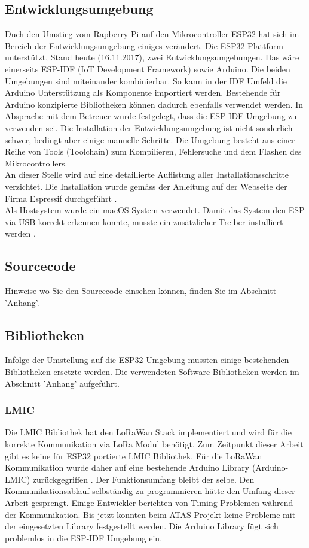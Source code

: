 \documentclass[11pt,english,german]{report}
\theoremstyle{definition}
\begin{document}
\subsection{Entwicklungsumgebung}
Duch den Umstieg vom Rapberry Pi auf den Mikrocontroller ESP32 hat sich im Bereich der Entwicklungsumgebung einiges verändert. Die ESP32 Plattform unterstützt, Stand heute (16.11.2017), zwei Entwicklungsumgebungen. Das wäre einerseits ESP-IDF (IoT Development Framework) sowie Arduino\cite{espidfarduino}. Die beiden Umgebungen sind miteinander kombinierbar. So kann in der IDF Umfeld die Arduino Unterstützung als Komponente importiert werden. Bestehende für Arduino konzipierte Bibliotheken können dadurch ebenfalls verwendet werden. In Absprache mit dem Betreuer wurde festgelegt, dass die ESP-IDF Umgebung zu verwenden sei. Die Installation der Entwicklungsumgebung ist nicht sonderlich schwer, bedingt aber einige manuelle Schritte. Die Umgebung besteht aus einer Reihe von Tools (Toolchain) zum Kompilieren, Fehlersuche und dem Flashen des Mikrocontrollers.\\[0.3cm]
An dieser Stelle wird auf eine detaillierte Auflistung aller Installationsschritte verzichtet. Die Installation wurde gemäss der Anleitung auf der Webseite der Firma Espressif durchgeführt \cite{espidfinstallation}.\\[0.3cm]
Als Hostsystem wurde ein macOS System verwendet. Damit das System den ESP via USB korrekt erkennen konnte, musste ein zusätzlicher Treiber installiert werden \cite{espidfdriver}. 

\subsection{Sourcecode}
Hinweise wo Sie den Sourcecode einsehen können, finden Sie im Abschnitt 'Anhang'.

\newpage

\subsection{Bibliotheken}
Infolge der Umstellung auf die ESP32 Umgebung mussten einige bestehenden Bibliotheken ersetzte werden. Die verwendeten Software Bibliotheken werden im Abschnitt 'Anhang' aufgeführt.

\subsubsection{LMIC}
Die LMIC Bibliothek hat den LoRaWan Stack implementiert und wird für die korrekte Kommunikation via LoRa Modul benötigt. Zum Zeitpunkt dieser Arbeit gibt es keine für ESP32 portierte LMIC Bibliothek. Für die LoRaWan Kommunikation wurde daher auf eine bestehende Arduino Library (Arduino-LMIC) zurückgegriffen \cite{ArduinoLMIC}. Der Funktionsumfang bleibt der selbe. Den Kommunikationsablauf selbständig zu programmieren hätte den Umfang dieser Arbeit gesprengt. Einige Entwickler berichten von Timing Problemen während der Kommunikation. Bis jetzt konnten beim ATAS Projekt keine Probleme mit der eingesetzten Library festgestellt werden. Die Arduino Library fügt sich problemlos in die ESP-IDF Umgebung ein.
\end{document}
